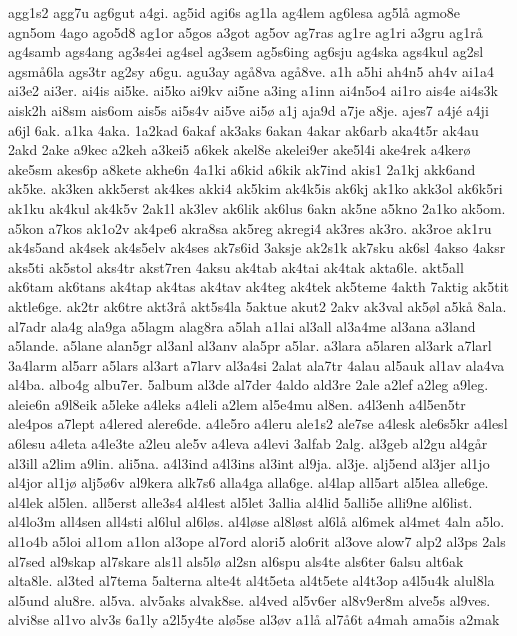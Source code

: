 {agg1s2
agg7u
ag6gut
a4gi.
ag5id
agi6s
ag1la
ag4lem
ag6lesa
ag5l^^e5
agmo8e
agn5om
4ago
ago5d8
ag1or
a5gos
a3got
ag5ov
ag7ras
ag1re
ag1ri
a3gru
ag1r^^e5
ag4samb
ags4ang
ag3s4ei
ag4sel
ag3sem
ag5s6ing
ag6sju
ag4ska
ags4kul
ag2sl
agsm^^e56la
ags3tr
ag2sy
a6gu.
agu3ay
ag^^e58va
ag^^e58ve.
a1h
a5hi
ah4n5
ah4v
ai1a4
ai3e2
ai3er.
ai4is
ai5ke.
ai5ko
ai9kv
ai5ne
a3ing
a1inn
ai4n5o4
ai1ro
ais4e
ai4s3k
aisk2h
ai8sm
ais6om
ais5s
ai5s4v
ai5ve
ai5^^f8
a1j
aja9d
a7je
a8je.
ajes7
a4j^^e9
a4ji
a6jl
6ak.
a1ka
4aka.
1a2kad
6akaf
ak3aks
6akan
4akar
ak6arb
aka4t5r
ak4au
2akd
2ake
a9kec
a2keh
a3kei5
a6kek
akel8e
akelei9er
ake5l4i
ake4rek
a4ker^^f8
ake5sm
akes6p
a8kete
akhe6n
4a1ki
a6kid
a6kik
ak7ind
akis1
2a1kj
akk6and
ak5ke.
ak3ken
akk5erst
ak4kes
akki4
ak5kim
ak4k5is
ak6kj
ak1ko
akk3ol
ak6k5ri
ak1ku
ak4kul
ak4k5v
2ak1l
ak3lev
ak6lik
ak6lus
6akn
ak5ne
a5kno
2a1ko
ak5om.
a5kon
a7kos
ak1o2v
ak4pe6
akra8sa
ak5reg
akregi4
ak3res
ak3ro.
ak3roe
ak1ru
ak4s5and
ak4sek
ak4s5elv
ak4ses
ak7s6id
3aksje
ak2s1k
ak7sku
ak6sl
4akso
4aksr
aks5ti
ak5stol
aks4tr
akst7ren
4aksu
ak4tab
ak4tai
ak4tak
akta6le.
akt5all
ak6tam
ak6tans
ak4tap
ak4tas
ak4tav
ak4teg
ak4tek
ak5teme
4akth
7aktig
ak5tit
aktle6ge.
ak2tr
ak6tre
akt3r^^e5
akt5s4la
5aktue
akut2
2akv
ak3val
ak5^^f8l
a5k^^e5
8ala.
al7adr
ala4g
ala9ga
a5lagm
alag8ra
a5lah
a1lai
al3all
al3a4me
al3ana
a3land
a5lande.
a5lane
alan5gr
al3anl
al3anv
ala5pr
a5lar.
a3lara
a5laren
al3ark
a7larl
3a4larm
al5arr
a5lars
al3art
a7larv
al3a4si
2alat
ala7tr
4alau
al5auk
al1av
ala4va
al4ba.
albo4g
albu7er.
5album
al3de
al7der
4aldo
ald3re
2ale
a2lef
a2leg
a9leg.
aleie6n
a9l8eik
a5leke
a4leks
a4leli
a2lem
al5e4mu
al8en.
a4l3enh
a4l5en5tr
ale4pos
a7lept
a4lered
alere6de.
a4le5ro
a4leru
ale1s2
ale7se
a4lesk
ale6s5kr
a4lesl
a6lesu
a4leta
a4le3te
a2leu
ale5v
a4leva
a4levi
3alfab
2alg.
al3geb
al2gu
al4g^^e5r
al3ill
a2lim
a9lin.
ali5na.
a4l3ind
a4l3ins
al3int
al9ja.
al3je.
alj5end
al3jer
al1jo
al4jor
al1j^^f8
alj5^^f86v
al9kera
alk7s6
alla4ga
alla6ge.
al4lap
all5art
al5lea
alle6ge.
al4lek
al5len.
all5erst
alle3s4
al4lest
al5let
3allia
al4lid
5alli5e
alli9ne
al6list.
al4lo3m
all4sen
all4sti
al6lul
al6l^^f8s.
al4l^^f8se
al8l^^f8st
al6l^^e5
al6mek
al4met
4aln
a5lo.
al1o4b
a5loi
al1om
a1lon
al3ope
al7ord
alori5
alo6rit
al3ove
alow7
alp2
al3ps
2als
al7sed
al9skap
al7skare
als1l
als5l^^f8
al2sn
al6spu
als4te
als6ter
6alsu
alt6ak
alta8le.
al3ted
al7tema
5alterna
alte4t
al4t5eta
al4t5ete
al4t3op
a4l5u4k
alul8la
al5und
alu8re.
al5va.
alv5aks
alvak8se.
al4ved
al5v6er
al8v9er8m
alve5s
al9ves.
alvi8se
al1vo
alv3s
6a1ly
a2l5y4te
al^^f85se
al3^^f8v
a1l^^e5
al7^^e56t
a4mah
ama5is
a2mak
}
